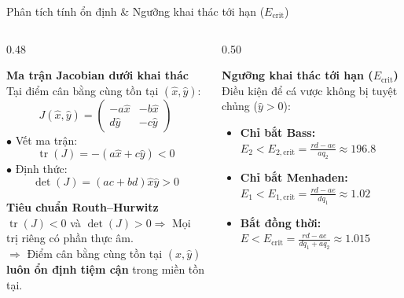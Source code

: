 \documentclass[aspectratio=169, 10pt]{beamer}
\renewcommand{\implies}{\ensuremath{\Rightarrow}}
\begin{document}
\begin{frame}{Phân tích tính ổn định \& Ngưỡng khai thác tới hạn ($E_{\mathrm{crit}}$)}
  \begin{columns}[t]
    \begin{column}{0.48\textwidth}
      \begin{block}{\textbf{Ma trận Jacobian dưới khai thác}}
        \footnotesize
        Tại điểm cân bằng cùng tồn tại $(\hat{x}, \hat{y})$:
        $$J(\hat{x}, \hat{y}) = \begin{pmatrix} -a\hat{x} & -b\hat{x} \\ d\hat{y} & -c\hat{y} \end{pmatrix}$$
        $\bullet$ Vết ma trận:
        $$\operatorname{tr}(J) = -(a\hat{x} + c\hat{y}) < 0$$
        $\bullet$ Định thức:
        $$\det(J) = (ac + bd)\hat{x}\hat{y} > 0$$
      \end{block}

      \vspace{0.1cm}

      \begin{exampleblock}{\textbf{Tiêu chuẩn Routh--Hurwitz}}
        \footnotesize
        $\operatorname{tr}(J) < 0$ và $\det(J) > 0 \implies$ Mọi trị riêng có phần thực âm.\\
        $\implies$ Điểm cân bằng cùng tồn tại $(\hat{x}, \hat{y})$ \textbf{luôn ổn định tiệm cận} trong miền tồn tại.
      \end{exampleblock}
    \end{column}

    \begin{column}{0.50\textwidth}
      \begin{alertblock}{\textbf{Ngưỡng khai thác tới hạn ($E_{\mathrm{crit}}$)}}
        \footnotesize
        Điều kiện để cá vược không bị tuyệt chủng ($\hat{y} > 0$):
        \begin{itemize}
          \setlength{\itemsep}{2pt}
          \item \textbf{Chỉ bắt Bass:} $E_2 < E_{2,\mathrm{crit}} = \frac{rd - ae}{aq_2} \approx \mathbf{196.8}$
          \item \textbf{Chỉ bắt Menhaden:} $E_1 < E_{1,\mathrm{crit}} = \frac{rd - ae}{dq_1} \approx \mathbf{1.02}$
          \item \textbf{Bắt đồng thời:} $E < E_{\mathrm{crit}} = \frac{rd - ae}{dq_1 + aq_2} \approx \mathbf{1.015}$
        \end{itemize}
      \end{alertblock}


\end{column}
\end{columns}
\end{frame}
\end{document}
